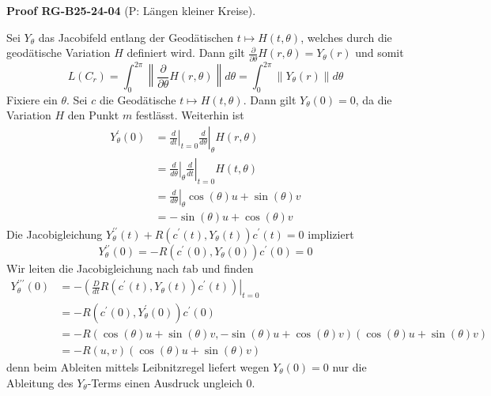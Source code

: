 \documentclass[10pt, letterpaper]{article}
\newcommand{\CustomHeading}[3]{%
  \par\medskip\noindent%
  \textbf{#1 #2} \textnormal{(#3)}.\enskip%
}
\newenvironment{PROOF}[2]{\begin{unitbox}\CustomHeading{Proof}{#1}{#2}}{\end{unitbox}}
\begin{document}
\begin{PROOF}{RG-B25-24-04}{P: Längen kleiner Kreise}
Sei $Y_{\theta}$ das Jacobifeld entlang der Geodätischen $t \mapsto H(t, \theta)$, welches durch die geodätische Variation $H$ definiert wird. Dann gilt $\frac{\partial}{\partial \theta} H(r, \theta)=Y_{\theta}(r)$ und somit
$$
L\left(C_{r}\right)=\int_{0}^{2 \pi}\left\|\frac{\partial}{\partial \theta} H(r, \theta)\right\| d \theta=\int_{0}^{2 \pi}\left\|Y_{\theta}(r)\right\| d \theta
$$
Fixiere ein $\theta$. Sei $c$ die Geodätische $t \mapsto H(t, \theta)$. Dann gilt $Y_{\theta}(0)=0$, da die Variation $H$ den Punkt $m$ festlässt. Weiterhin ist
$$
\begin{aligned}
Y_{\theta}^{\prime}(0) & =\left.\left.\frac{d}{d t}\right|_{t=0} \frac{d}{d \theta}\right|_{\theta} H(r, \theta) \\
& =\left.\left.\frac{d}{d \theta}\right|_{\theta} \frac{d}{d t}\right|_{t=0} H(t, \theta) \\
& =\left.\frac{d}{d \theta}\right|_{\theta} \cos (\theta) u+\sin (\theta) v \\
& =-\sin (\theta) u+\cos (\theta) v
\end{aligned}
$$
Die Jacobigleichung $Y_{\theta}^{\prime \prime}(t)+R\left(c^{\prime}(t), Y_{\theta}(t)\right) c^{\prime}(t)=0$ impliziert
$$
Y_{\theta}^{\prime \prime}(0)=-R\left(c^{\prime}(0), Y_{\theta}(0)\right) c^{\prime}(0)=0
$$
Wir leiten die Jacobigleichung nach $t \mathrm{ab}$ und finden
$$
\begin{aligned}
Y_{\theta}^{\prime \prime \prime}(0) & =-\left.\left(\frac{D}{d t} R\left(c^{\prime}(t), Y_{\theta}(t)\right) c^{\prime}(t)\right)\right|_{t=0} \\
& =-R\left(c^{\prime}(0), Y_{\theta}^{\prime}(0)\right) c^{\prime}(0) \\
& =-R(\cos (\theta) u+\sin (\theta) v,-\sin (\theta) u+\cos (\theta) v)(\cos (\theta) u+\sin (\theta) v) \\
& =-R(u, v)(\cos (\theta) u+\sin (\theta) v)
\end{aligned}
$$
denn beim Ableiten mittels Leibnitzregel liefert wegen $Y_{\theta}(0)=0$ nur die Ableitung des $Y_{\theta}$-Terms einen Ausdruck ungleich 0.


\end{PROOF}
\end{document}
